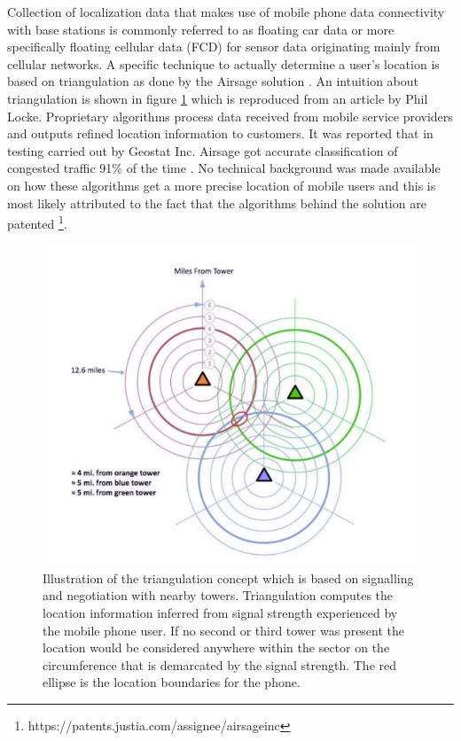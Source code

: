\documentclass[12pt, a4paper]{report}
\theoremstyle{definition}
\theoremstyle{definition}%
\theoremstyle{definition}%
\theoremstyle{definition}%
\theoremstyle{definition}%
\theoremstyle{definition}%
\begin{document}
Collection of localization data that makes use of mobile phone data connectivity with base stations is commonly referred to as floating car data or more specifically floating cellular data (FCD) for sensor data originating mainly from cellular networks. A specific technique to actually determine a user's location is based on triangulation as done by the Airsage solution \cite{Hoteit2014}. An intuition about triangulation is shown in figure \ref{fig:triangulation} which is reproduced from an article by Phil Locke. Proprietary algorithms process data received from mobile service providers and outputs refined location information to customers. It was reported that in testing carried out by Geostat Inc. Airsage got accurate classification of congested traffic 91\% of the time  \cite{Wang2012}. No technical background was made available on how these algorithms get a more precise location of mobile users and this is most likely attributed to the fact that the algorithms behind the solution are patented \footnote{https://patents.justia.com/assignee/airsage\-inc}.  

\begin{figure}[!] 
	\includegraphics[scale=0.75]{triangulation.jpg}
	\centering
	\caption[Triangulation concept]{
		Illustration of the triangulation concept which is based on signalling and negotiation with nearby towers. Triangulation computes the location information inferred from signal strength experienced by the mobile phone user. If no second or third tower was present the location would be considered anywhere within the sector on the circumference that is demarcated by the signal strength. The red ellipse is the location boundaries for the phone.}
	\label{fig:triangulation}
\end{figure}
\end{document}
